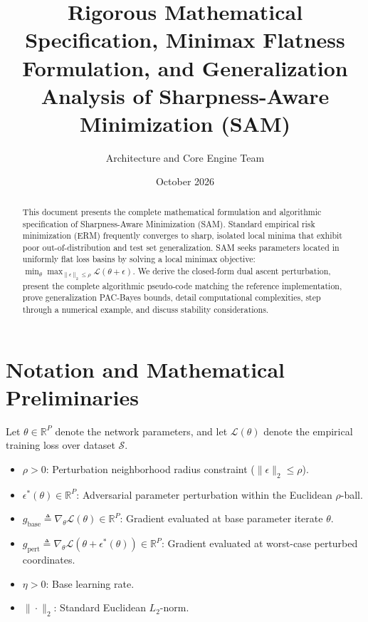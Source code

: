 \documentclass[11pt,a4paper]{article}
\title{\textbf{Rigorous Mathematical Specification, Minimax Flatness Formulation, and Generalization Analysis of Sharpness-Aware Minimization (SAM)}}
\author{Architecture and Core Engine Team}
\date{October 2026}
\theoremstyle{definition}
\begin{document}
\maketitle

\begin{abstract}
This document presents the complete mathematical formulation and algorithmic specification of Sharpness-Aware Minimization (SAM). Standard empirical risk minimization (ERM) frequently converges to sharp, isolated local minima that exhibit poor out-of-distribution and test set generalization. SAM seeks parameters located in uniformly flat loss basins by solving a local minimax objective: $\min_\theta \max_{\|\epsilon\|_2 \le \rho} \mathcal{L}(\theta + \epsilon)$. We derive the closed-form dual ascent perturbation, present the complete algorithmic pseudo-code matching the reference implementation, prove generalization PAC-Bayes bounds, detail computational complexities, step through a numerical example, and discuss stability considerations.
\end{abstract}

\section{Notation and Mathematical Preliminaries}

Let $\theta \in \mathbb{R}^P$ denote the network parameters, and let $\mathcal{L}(\theta)$ denote the empirical training loss over dataset $\mathcal{S}$.

\begin{itemize}
    \item $\rho > 0$: Perturbation neighborhood radius constraint ($\|\epsilon\|_2 \le \rho$).
    \item $\epsilon^*(\theta) \in \mathbb{R}^P$: Adversarial parameter perturbation within the Euclidean $\rho$-ball.
    \item $g_{\text{base}} \triangleq \nabla_\theta \mathcal{L}(\theta) \in \mathbb{R}^P$: Gradient evaluated at base parameter iterate $\theta$.
    \item $g_{\text{pert}} \triangleq \nabla_\theta \mathcal{L}(\theta + \epsilon^*(\theta)) \in \mathbb{R}^P$: Gradient evaluated at worst-case perturbed coordinates.
    \item $\eta > 0$: Base learning rate.
    \item $\|\cdot\|_2$: Standard Euclidean $L_2$-norm.
\end{itemize}
\end{document}
